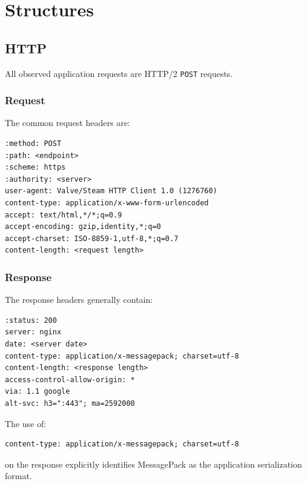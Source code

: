 \section{Structures}

\subsection{HTTP}


All observed application requests are HTTP/2 \texttt{POST} requests.

\subsubsection{Request}

The common request headers are:

\begin{lstlisting}
:method: POST
:path: <endpoint>
:scheme: https
:authority: <server>
user-agent: Valve/Steam HTTP Client 1.0 (1276760)
content-type: application/x-www-form-urlencoded
accept: text/html,*/*;q=0.9
accept-encoding: gzip,identity,*;q=0
accept-charset: ISO-8859-1,utf-8,*;q=0.7
content-length: <request length>
\end{lstlisting}

\subsubsection{Response}

The response headers generally contain:

\begin{lstlisting}
:status: 200
server: nginx
date: <server date>
content-type: application/x-messagepack; charset=utf-8
content-length: <response length>
access-control-allow-origin: *
via: 1.1 google
alt-svc: h3=":443"; ma=2592000
\end{lstlisting}

The use of:

\begin{lstlisting}
content-type: application/x-messagepack; charset=utf-8
\end{lstlisting}

on the response explicitly identifies MessagePack as the application
serialization format.

